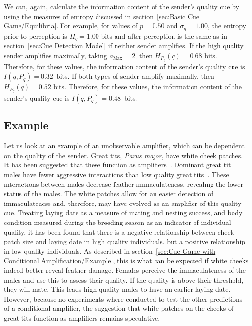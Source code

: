 \documentclass[a4paper,12pt]{article}
\numberwithin{equation}{section}
\begin{document}
We can, again, calculate the information content of the sender's quality cue by using the measures of entropy discussed in section~\ref{sec:Basic Cue Game/Equilibria}. For example, for values of $p = 0.50$ and $\sigma_{q} = 1.00$, the entropy prior to perception is $H_{q} = 1.00$ bits and after perception is the same as in section~\ref{sec:Cue Detection Model} if neither sender amplifies. If the high quality sender amplifies maximally, taking $a_{\text{Max}}=2$, then $H_{P_{q}}(q) = 0.68$ bits. Therefore, for these values, the information content of the sender's quality cue is $I(q, P_{q}) = 0.32$~bits. If both types of sender amplify maximally, then $H_{P_{q}}(q) = 0.52$ bits. Therefore, for these values, the information content of the sender's quality cue is $I(q, P_{q}) = 0.48$~bits.


\subsection{Example}
\label{sec:CueDetectionModelwithAmplification/Example}

Let us look at an example of an unobservable amplifier, which can be dependent on the quality of the sender. Great tits, \textit{Parus major}, have white cheek patches. It has been suggested that these function as amplifiers~\cite{Galvan2008}. Dominant great tit males have fewer aggressive interactions than low quality great tits~\cite{Ferns2004}. These interactions between males decrease feather immaculateness, revealing the lower status of the males. The white patches allow for an easier detection of immaculateness and, therefore, may have evolved as an amplifier of this quality cue. Treating laying date as a measure of mating and nesting success, and body condition measured during the breeding season as an indicator of individual quality, it has been found that there is a negative relationship between cheek patch size and laying date in high quality individuals, but a positive relationship in low quality individuals. As described in section~\ref{sec:Cue Game with Conditional Amplification/Example}, this is what can be expected if white cheeks indeed better reveal feather damage. Females perceive the immaculateness of the males and use this to assess their quality. If the quality is above their threshold, they will mate. This leads high quality males to have an earlier laying date. However, because no experiments where conducted to test the other predictions of a conditional amplifier, the suggestion that white patches on the cheeks of great tits function as amplifiers remains speculative.
\end{document}
